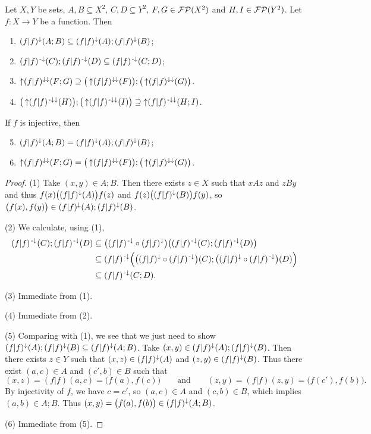 \begin{proposition} \label{imageFilterComposition}
Let $X, Y$ be sets, $A,B\subseteq X^2$, $C,D\subseteq Y^2$, $F,G\in\operatorname{\mathcal{FP}}(X^2)$ and $H,I\in \operatorname{\mathcal{FP}}(Y^2)$. Let $f: X\to Y$ be a function. Then
\begin{enumerate}
\item $(f|f)^{\downarrow}(A;B) \subseteq (f|f)^{\downarrow}(A);(f|f)^\downarrow(B)$;
\item $(f|f)^{{\text{\hspace{0.15em}-}\downarrow}}(C);(f|f)^{\text{\hspace{0.15em}-}\downarrow}(D) \subseteq (f|f)^{{\text{\hspace{0.15em}-}\downarrow}}(C;D)$;
\item $\operatorname{\uparrow}(f|f)^{\downarrow\downarrow}(F;G) \supseteq \big(\operatorname{\uparrow}(f|f)^{\downarrow\downarrow}(F)\big);\big(\operatorname{\uparrow}(f|f)^{\downarrow\downarrow}(G)\big)$.
\item $\big(\operatorname{\uparrow}(f|f)^{{\text{\hspace{0.15em}-}\downarrow}\downarrow}(H)\big);\big(\operatorname{\uparrow}(f|f)^{{\text{\hspace{0.15em}-}\downarrow}\downarrow}(I)\big) \supseteq \operatorname{\uparrow}(f|f)^{{\text{\hspace{0.15em}-}\downarrow}\downarrow}(H;I)$.
\end{enumerate}
If $f$ is injective, then
\begin{enumerate} \setcounter{enumi}{4}
\item $(f|f)^{\downarrow}(A;B) = (f|f)^{\downarrow}(A);(f|f)^\downarrow(B)$;
\item $\operatorname{\uparrow}(f|f)^{\downarrow\downarrow}(F;G) = \big(\operatorname{\uparrow}(f|f)^{\downarrow\downarrow}(F)\big);\big(\operatorname{\uparrow}(f|f)^{\downarrow\downarrow}(G)\big)$.
\end{enumerate}
\end{proposition}
\begin{proof}
(1) Take $(x,y)\in A;B$. Then there exists $z\in X$ such that $xAz$ and $zBy$ and thus $f(x)\big((f|f)^{\downarrow}(A)\big)f(z)$ and $f(z)\big((f|f)^{\downarrow}(B)\big)f(y)$, so $\big(f(x), f(y)\big)\in (f|f)^{\downarrow}(A);(f|f)^\downarrow(B)$.

(2) We calculate, using (1),
\begin{align*}
(f|f)^{{\text{\hspace{0.15em}-}\downarrow}}(C);(f|f)^{\text{\hspace{0.15em}-}\downarrow}(D) &\subseteq \big((f|f)^{{\text{\hspace{0.15em}-}\downarrow}}\circ (f|f)^\downarrow\big)\big((f|f)^{{\text{\hspace{0.15em}-}\downarrow}}(C);(f|f)^{{\text{\hspace{0.15em}-}\downarrow}}(D)\big) \\
&\subseteq (f|f)^{{\text{\hspace{0.15em}-}\downarrow}}\Big(\big((f|f)^{\downarrow}\circ(f|f)^{{\text{\hspace{0.15em}-}\downarrow}}\big)(C);\big((f|f)^{\downarrow}\circ(f|f)^{{\text{\hspace{0.15em}-}\downarrow}}\big)(D)\Big) \\
&\subseteq (f|f)^{{\text{\hspace{0.15em}-}\downarrow}}(C;D).
\end{align*}

(3) Immediate from (1).

(4) Immediate from (2).

(5) Comparing with (1), we see that we just need to show $(f|f)^{\downarrow}(A);(f|f)^\downarrow(B) \subseteq (f|f)^{\downarrow}(A;B)$. Take $(x,y)\in (f|f)^{\downarrow}(A);(f|f)^\downarrow(B)$. Then there exists $z\in Y$ such that $(x, z) \in (f|f)^{\downarrow}(A)$ and $(z, y)\in (f|f)^\downarrow(B)$. Thus there exist $(a,c)\in A$ and $(c', b)\in B$ such that \[ (x,z) = (f|f)(a,c) = \big(f(a), f(c)\big) \qquad\text{and}\qquad (z,y) = (f|f)(z,y) = \big(f(c'), f(b)\big). \]
By injectivity of $f$, we have $c=c'$, so $(a,c)\in A$ and $(c,b)\in B$, which implies $(a,b)\in A;B$. Thus $(x,y) = \big(f(a), f(b)\big) \in (f|f)^{\downarrow}(A;B)$.

(6) Immediate from (5).
\end{proof}

